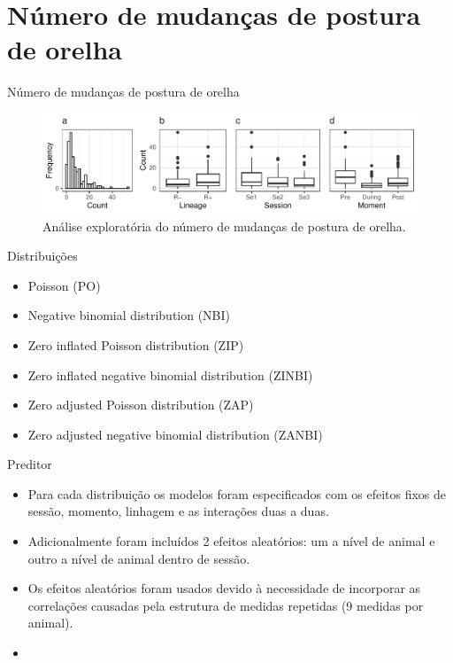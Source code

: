 \documentclass[
  ignorenonframetext,
  serif,
  professionalfont,
  usenames,
  dvipsnames,
  aspectratio = 169]{beamer}
\providecommand{\tightlist}{%
  \setlength{\itemsep}{0pt}\setlength{\parskip}{0pt}}
\renewcommand{\tightlist}{%
  \setlength{\itemsep}{0\baselineskip}
  \setlength{\parskip}{0.25\baselineskip}
}
\begin{document}
\hypertarget{nuxfamero-de-mudanuxe7as-de-postura-de-orelha}{%
\section{Número de mudanças de postura de
orelha}\label{nuxfamero-de-mudanuxe7as-de-postura-de-orelha}}

\begin{frame}{Número de mudanças de postura de orelha}
\protect\hypertarget{nuxfamero-de-mudanuxe7as-de-postura-de-orelha-1}{}
\begin{figure}

{\centering \includegraphics[width=0.95\linewidth]{./img/count} 

}

\caption{Análise exploratória do número de mudanças de postura de orelha.}\label{fig:unnamed-chunk-10}
\end{figure}
\end{frame}

\begin{frame}{Distribuições}
\protect\hypertarget{distribuiuxe7uxf5es}{}
\begin{itemize}
\tightlist
\item
  Poisson (PO)
\item
  Negative binomial distribution (NBI)
\item
  Zero inflated Poisson distribution (ZIP)
\item
  Zero inflated negative binomial distribution (ZINBI)
\item
  Zero adjusted Poisson distribution (ZAP)
\item
  Zero adjusted negative binomial distribution (ZANBI)
\end{itemize}
\end{frame}

\begin{frame}{Preditor}
\protect\hypertarget{preditor}{}
\begin{itemize}
\item
  Para cada distribuição os modelos foram especificados com os efeitos
  fixos de sessão, momento, linhagem e as interações duas a duas.
\item
  Adicionalmente foram incluídos 2 efeitos aleatórios: um a nível de
  animal e outro a nível de animal dentro de sessão.
\item
  Os efeitos aleatórios foram usados devido à necessidade de incorporar
  as correlações causadas pela estrutura de medidas repetidas (9 medidas
  por animal).
\item
\end{itemize}
\end{frame}
\end{document}
